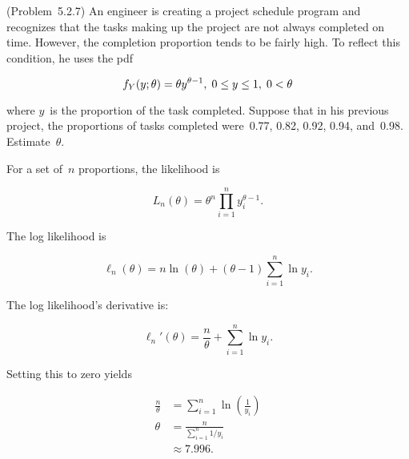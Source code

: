 \begin{problem}
  (\textnormal{Problem~5.2.7}) An engineer is creating a project schedule program and recognizes that the tasks making up the project are not always completed on time.  However, the completion proportion tends to be fairly high.  To reflect this condition, he uses the pdf

  \begin{equation}\label{eq:P04}
    f_{Y}(y;\theta)=\theta y^{\theta - 1}, \hspace{0.1cm} 0 \leq y \leq 1, \hspace{0.1cm} 0 < \theta
  \end{equation}

  \noindent
  where $y$~is the proportion of the task completed.  Suppose that in his previous project, the proportions of tasks completed were~0.77, 0.82, 0.92, 0.94, and~0.98.  Estimate~$\theta$.
\end{problem}

For a set of~$n$ proportions, the likelihood is

\begin{equation}\label{eq:P04:Likelihood}
  L_{n}(\theta) = \theta^{n} \prod_{i=1}^{n} y_{i}^{\theta - 1} \text{.}
\end{equation}

\noindent
The log likelihood is

\begin{equation}\label{eq:P04:LogLikelihood}
  \ell_{n}(\theta) = n\ln(\theta) + (\theta - 1) \sum_{i=1}^{n} \ln y_i \text{.}
\end{equation}

\noindent
The log likelihood's derivative is:

\begin{equation}\label{eq:P04:LogLikelihood:Deriv}
  \ell_{n}'(\theta) = \frac{n}{\theta} + \sum_{i=1}^{n} \ln y_i \text{.}
\end{equation}

\noindent
Setting this to zero yields

\begin{align}
  \frac{n}{\theta} &= \sum_{i=1}^{n} \ln\left(\frac{1}{y_i} \right) \\
  \theta &= \frac{n}{\sum_{i=1}^{n} 1 / y_i} \\
         &\approx \boxed{7.996} \text{.}
\end{align}
